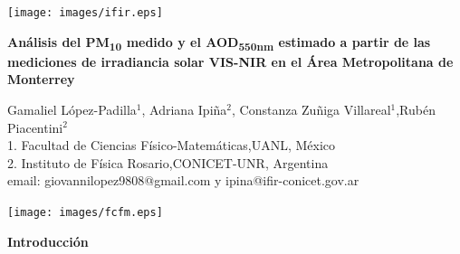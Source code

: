 \documentclass{article}
\begin{document}
\vspace*{-2cm}
\changefontsizes{14pt}
\hspace*{-1cm}
\begin{minipage}{0.2\linewidth}
\vspace{0.7cm}
\vspace*{-0.15cm}
\texttt{[image: images/ifir.eps]}
\end{minipage}
\vspace*{-0.4cm}
\begin{minipage}{0.6\linewidth}
\vspace*{0.7cm}
\begin{center}
\changefontsizes{15pt}
\hspace*{-0.1cm}
\textbf{\textcolor{title}{Análisis del PM\textsubscript{10} medido y el AOD\textsubscript{550nm} estimado a partir de las mediciones de irradiancia solar VIS-NIR en el Área Metropolitana de Monterrey}}
\end{center}
\vspace{-1cm}
\begin{center}
\changefontsizes{11pt}
Gamaliel López-Padilla$^1$, Adriana Ipiña$^{2}$, Constanza Zuñiga Villareal$^{1}$,Rubén Piacentini$^{2}$\\
1. Facultad de Ciencias Físico-Matemáticas,UANL, México\\
2. Instituto de Física Rosario,CONICET-UNR, Argentina\\
email: giovannilopez9808@gmail.com y ipina@ifir-conicet.gov.ar
\end{center}
\end{minipage}
\begin{minipage}{0.2\linewidth}
\hspace*{0.2cm}
\texttt{[image: images/fcfm.eps]}
\end{minipage}
\vspace{0.2cm}
\changefontsizes{12pt}
\begin{center}
\begin{shaded}
\textbf{\textcolor{ver}{Introducción}}
\end{shaded}
\end{center}
\end{document}
